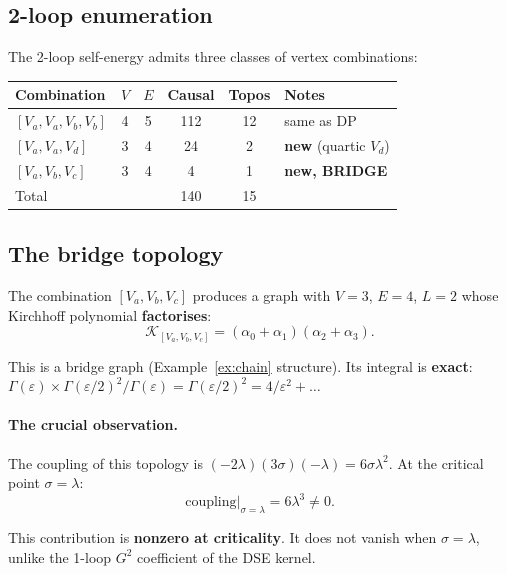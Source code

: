 \documentclass[11pt,a4paper]{article}
\theoremstyle{definition}
\newcommand{\K}{\mathcal{K}}
\begin{document}
\subsection{2-loop enumeration}

The 2-loop self-energy admits three classes of vertex combinations:

\begin{center}
\renewcommand{\arraystretch}{1.3}
\begin{tabular}{lccccl}
\toprule
Combination & $V$ & $E$ & Causal & Topos & Notes \\
\midrule
$[V_a, V_a, V_b, V_b]$ & 4 & 5 & 112 & 12 & same as DP \\
$[V_a, V_a, V_d]$ & 3 & 4 & 24 & 2 & \textbf{new} (quartic $V_d$) \\
$[V_a, V_b, V_c]$ & 3 & 4 & 4 & 1 & \textbf{new, BRIDGE} \\
\midrule
Total & & & 140 & 15 & \\
\bottomrule
\end{tabular}
\end{center}

\subsection{The bridge topology}

The combination $[V_a, V_b, V_c]$ produces a graph with
$V = 3$, $E = 4$, $L = 2$ whose Kirchhoff polynomial
\textbf{factorises}:
\begin{equation}
\K_{[V_a, V_b, V_c]} = (\alpha_0 + \alpha_1)(\alpha_2 + \alpha_3).
\end{equation}

This is a bridge graph (Example~\ref{ex:chain} structure).
Its integral is \textbf{exact}:
$\Gamma(\varepsilon) \times \Gamma(\varepsilon/2)^2 / \Gamma(\varepsilon)
= \Gamma(\varepsilon/2)^2 = 4/\varepsilon^2 + \ldots$

\paragraph{The crucial observation.}
The coupling of this topology is
$(-2\lambda)(3\sigma)(-\lambda) = 6\sigma\lambda^2$.
At the critical point $\sigma = \lambda$:
\begin{equation}
\text{coupling}\big|_{\sigma=\lambda} = 6\lambda^3 \neq 0.
\end{equation}

This contribution is \textbf{nonzero at criticality}.
It does not vanish when $\sigma = \lambda$, unlike the 1-loop
$G^2$ coefficient of the DSE kernel.
\end{document}
